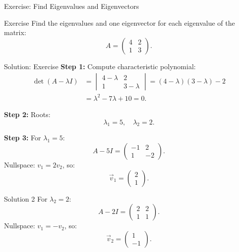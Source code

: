 \documentclass{beamer}
\begin{document}
\begin{frame}{Exercise: Find Eigenvalues and Eigenvectors}
\begin{block}{Exercise}
Find the eigenvalues and one eigenvector for each eigenvalue of the matrix:
\begin{equation}
A =
\begin{pmatrix} 4 & 2 \\ 1 & 3 \end{pmatrix}.
\end{equation}
\end{block}
\end{frame}

\begin{frame}{Solution: Exercise}
\textbf{Step 1:} Compute characteristic polynomial:
\begin{align}
\det(A-\lambda I) &=
\begin{vmatrix}4-\lambda &2 \\1 &3-\lambda\end{vmatrix} =
(4-\lambda)(3-\lambda)-2 \\
&= \lambda^2 -7\lambda+10=0.
\end{align}

\textbf{Step 2:} Roots:
\begin{equation}
\lambda_1=5, \quad \lambda_2=2.
\end{equation}

\textbf{Step 3:} For \(\lambda_1=5\):
\begin{equation}
A-5I =
\begin{pmatrix}-1&2\\1&-2\end{pmatrix}.
\end{equation}
Nullspace: \(v_1=2v_2\), so:
\begin{equation}
\vec{v}_1 =
\begin{pmatrix}2\\1\end{pmatrix}.
\end{equation}

\end{frame}
\begin{frame}{Solution 2}
For \(\lambda_2=2\):
\begin{equation}
A-2I =
\begin{pmatrix}2&2\\1&1\end{pmatrix}.
\end{equation}
Nullspace: \(v_1=-v_2\), so:
\begin{equation}
\vec{v}_2 =
\begin{pmatrix}1\\-1\end{pmatrix}.
\end{equation}
\end{frame}
\end{document}
